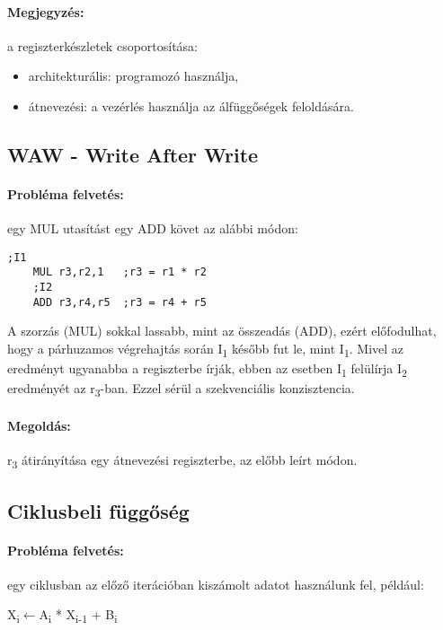 \paragraph{Megjegyzés:} a regiszterkészletek csoportosítása:
\begin{itemize}
    \item architekturális: programozó használja,
    \item átnevezési: a vezérlés használja az álfüggőségek feloldására.
\end{itemize}

\subsection{WAW - Write After Write}
\paragraph{Probléma felvetés:} egy MUL utasítást egy ADD követ az alábbi módon:
\begin{lstlisting}[language=Ant]
    ;I1
    MUL r3,r2,1   ;r3 = r1 * r2
    ;I2
    ADD r3,r4,r5  ;r3 = r4 + r5
\end{lstlisting}
A szorzás (MUL) sokkal lassabb, mint az összeadás (ADD), ezért előfodulhat, hogy a párhuzamos
végrehajtás során I\textsubscript{1} később fut le, mint I\textsubscript{1}.
Mivel az eredményt ugyanabba a regiszterbe írják, ebben az esetben I\textsubscript{1} felülírja I\textsubscript{2} eredményét az r\textsubscript{3}-ban.
Ezzel sérül a szekvenciális konzisztencia.
\paragraph{Megoldás:} r\textsubscript{3} átirányítása egy átnevezési regiszterbe, az előbb leírt módon.

\subsection{Ciklusbeli függőség}

\paragraph{Probléma felvetés:}
egy ciklusban az előző iterációban kiszámolt adatot használunk fel, például:
\begin{algorithmic}
    \STATE X\textsubscript{i}$\leftarrow$A\textsubscript{i} * X\textsubscript{i-1} + B\textsubscript{i}
    \ENDFOR
\end{algorithmic}
